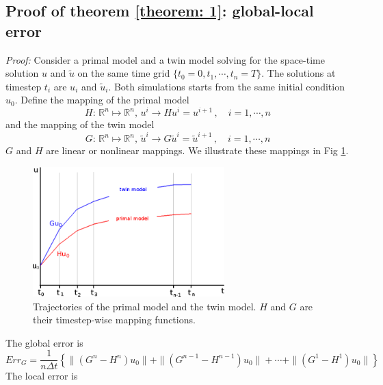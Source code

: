 \documentclass[a4paper,onecolumn]{article}
\theoremstyle{remark}
\begin{document}
\newpage
\begin{appendices}
    \section{Proof of theorem \ref{theorem: 1}: global-local error}
    \label{appendix 1}
    \emph{Proof:} Consider a primal model and a twin model solving
    for the space-time solution $u$ and $\tilde{u}$ on the same
    time grid $\{t_0=0,t_1,\cdots, t_n=T\}$. The solutions at timestep $t_i$
    are $u_i$ and $\tilde{u}_{i}$. Both simulations 
    starts from the same initial condition $u_0$. Define the mapping
    of the primal model 
    \begin{equation}
        H:\, \mathbb{R}^n\mapsto\mathbb{R}^n,\, u^i\rightarrow Hu^i = u^{i+1}\,,
        \quad i=1,\cdots, n
    \end{equation}
    and the mapping of the twin model
    \begin{equation}
        G:\, \mathbb{R}^n\mapsto\mathbb{R}^n,\, \tilde{u}^i\rightarrow 
        G\tilde{u}^i = \tilde{u}^{i+1}\,,\quad i=1,\cdots, n
    \end{equation}
    $G$ and $H$ are linear or nonlinear mappings.
    We illustrate these mappings in Fig \ref{fig:sketch}.
    \begin{figure}[H]\begin{center}
        \includegraphics[height=5cm]{sketch.png}
        \caption{Trajectories of the primal model and the twin model. 
                 $H$ and $G$ are their timestep-wise mapping functions.}
        \label{fig:sketch}
    \end{center}\end{figure}
    \noindent The global error is
    \begin{equation}
        Err_G = \frac{1}{n\Delta t}\left\{ \|(G^n - H^n) u_0\| + \|(G^{n-1}-H^{n-1})u_0\|
        +\cdots+\|(G^1-H^1)u_0\| \right\}
        \label{global error}
    \end{equation}
    The local error is
    \begin{equation}

\end{equation}
\end{appendices}
\end{document}
